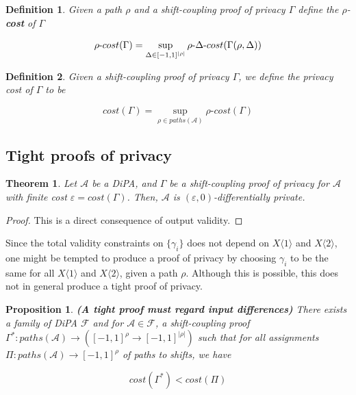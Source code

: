\documentclass{article}
\newtheorem{theorem}{Theorem}
\newtheorem{proposition}{Proposition}[section]
\newtheorem{definition}{Definition}[section]
\renewcommand{\epsilon}{\varepsilon}
\newcommand{\1}{\langle 1 \rangle}
\newcommand{\2}{\langle 2 \rangle}
\begin{document}
\begin{definition}
    Given a path $\rho$ and a shift-coupling proof of privacy $\Gamma$ define the $\rho$-\textbf{cost} of $\Gamma$

    \[\rho{\text -}cost(\Gamma) = \sup_{\Delta \in [-1, 1]^{|\rho|}} \rho{\text -}\Delta{\text -}cost(\Gamma(\rho, \Delta))\]
\end{definition}

\begin{definition}
    Given a shift-coupling proof of privacy $\Gamma$, we define the privacy cost of $\Gamma$ to be

    \[cost(\Gamma) = \sup_{\rho \in paths(\mathcal{A})} \rho\text{-}cost(\Gamma)\]
\end{definition}

\subsection{Tight proofs of privacy}

\begin{theorem}
    Let $\mathcal{A}$ be a DiPA, and $\Gamma$ be a shift-coupling proof of privacy for $\mathcal{A}$ with finite cost $\epsilon = cost(\Gamma)$. Then, $\mathcal{A}$ is $(\epsilon, 0)$-differentially private.
\end{theorem}

\begin{proof}
    This is a direct consequence of output validity. 
\end{proof}

Since the total validity constraints on $\{\gamma_i\}$ does not depend on $X \1$ and $X \2$, one might be tempted to produce a proof of privacy by choosing $\gamma_i$ to be the same for all $X \1$ and $X \2$, given a path $\rho$. Although this is possible, this does not in general produce a tight proof of privacy.

\begin{proposition}
    \label{prop:proofs_must_regard_input_differences}
    \textbf{(A tight proof must regard input differences)} There exists a family of DiPA $\mathcal{F}$ and for $\mathcal{A} \in \mathcal{F}$, a shift-coupling proof $\Gamma^*: paths(\mathcal{A}) \to ([-1, 1]^{\rho} \to [-1, 1]^{|\rho|})$ such that for all assignments $\Pi: paths(\mathcal{A}) \to [-1, 1]^{\rho}$ of paths to shifts, we have 

    \[cost(\Gamma^*) < cost(\Pi)\]
\end{proposition}
\end{document}
